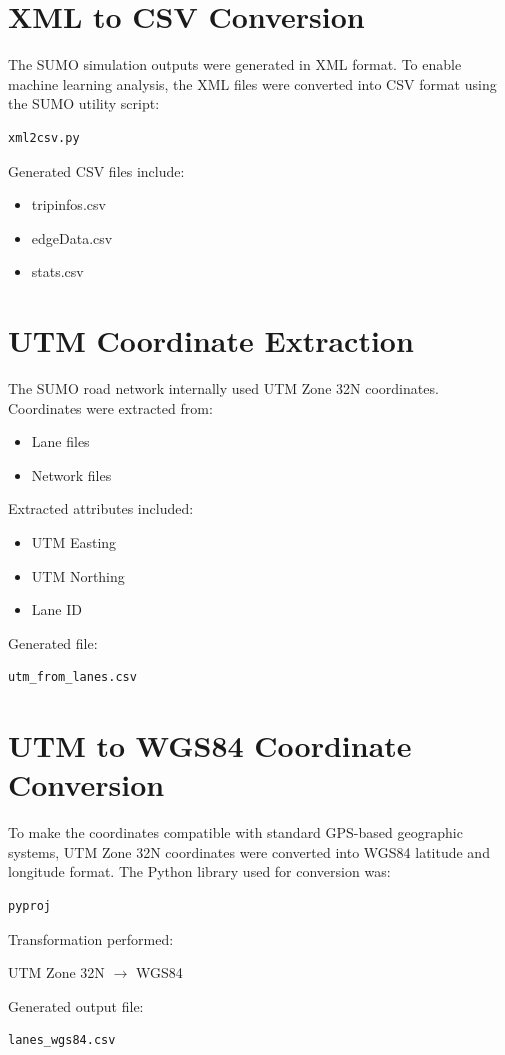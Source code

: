 \documentclass[12pt,a4paper]{report}
\begin{document}
\section{XML to CSV Conversion}
The SUMO simulation outputs were generated in XML format.
To enable machine learning analysis, the XML files were converted into CSV format using the SUMO utility script:
\begin{verbatim}
xml2csv.py
\end{verbatim}
Generated CSV files include:
\begin{itemize}
    \item tripinfos.csv
    \item edgeData.csv
    \item stats.csv
\end{itemize}

\section{UTM Coordinate Extraction}
The SUMO road network internally used UTM Zone 32N coordinates.
Coordinates were extracted from:
\begin{itemize}
    \item Lane files
    \item Network files
\end{itemize}
Extracted attributes included:
\begin{itemize}
    \item UTM Easting
    \item UTM Northing
    \item Lane ID
\end{itemize}
Generated file:
\begin{verbatim}
utm_from_lanes.csv
\end{verbatim}

\section{UTM to WGS84 Coordinate Conversion}
To make the coordinates compatible with standard GPS-based geographic systems, UTM Zone 32N coordinates were converted into WGS84 latitude and longitude format.
The Python library used for conversion was:
\begin{verbatim}
pyproj
\end{verbatim}
Transformation performed:
\begin{center}
UTM Zone 32N $\rightarrow$ WGS84
\end{center}
Generated output file:
\begin{verbatim}
lanes_wgs84.csv
\end{verbatim}
\end{document}
